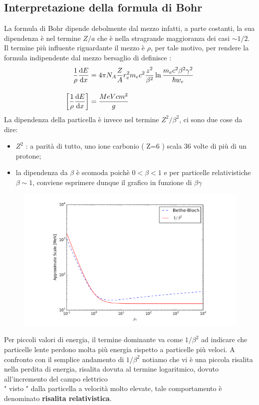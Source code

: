 \subsection{Interpretazione della formula di Bohr}
La formula di Bohr dipende debolmente dal mezzo infatti, a parte costanti, la sua dipendenza 
è nel termine $Z/a$ che è nella stragrande maggioranza dei casi $\sim 1/2$. \\
Il termine più influente riguardante il mezzo è $\rho$, per tale motivo, per rendere la formula indipendente dal mezzo 
bersaglio di definisce : 
\begin{align*}
        \frac{1}{\rho}\frac{\dd{E}}{\dd{x}} &= 4\pi N_{A}\frac{Z}{A}r_{e}^2m_{e}c^2\frac{z^2}{\beta^2}\ln{\frac{m_{e}c^2\beta^2\gamma^2}{\hbar w_{e}}} \\[1em]
        \qty[\frac{1}{\rho}\frac{\dd{E}}{\dd{x}}] &= \frac{MeVcm^2}{g} 
\end{align*}
La dipendenza della particella è invece nel termine $Z^2/\beta^2$, ci sono due cose da dire: 
\begin{itemize}
        \item $Z^2$ : a parità di tutto, uno ione carbonio ( Z=6 ) scala 36 volte di più di un protone;
        \item la dipendenza da $\beta$ è scomoda poichè $0<\beta<1$ e per particelle relativistiche $\beta \sim 1$, conviene 
                esprimere dunque il grafico in funzione di $\beta\gamma$
\end{itemize}
\begin{figure}[h!]
        \centering
        \includegraphics[scale=0.5]{ch6InterazioneMateria/BohrGrafico}
\end{figure}

Per piccoli valori di energia, il termine dominante va come $1/\beta^2$ ad indicare che particelle lente perdono molta 
più energia rispetto a particelle più veloci.
A confronto con il semplice andamento di $1/\beta^2$ notiamo che vi è una piccola risalita nella perdita di energia, 
risalita dovuta al termine logaritmico, dovuto all'incremento del campo elettrico \\ " visto " dalla particella a velocità 
molto elevate, tale comportamento è denominato \textbf{risalita relativistica}.
\newpage
